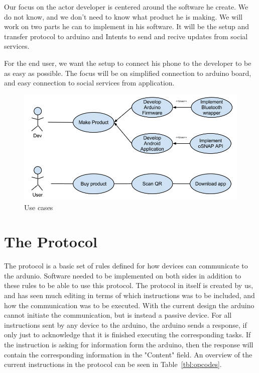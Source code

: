 Our focus on the actor developer is centered around the software he create. We do not know, and we don't need to know what product he is making. We will work on two parts he can to implement in his software. It will be the setup and transfer protocol to arduino and Intents to send and recive updates from social services.

For the end user, we want the setup to connect his phone to the developer to be as easy as possible. The focus will be on simplified connection to arduino board, and easy connection to social services from application.
\begin{figure}[hb!]
\centering \includegraphics[scale=0.50]{img/use-cases.png}
\caption{Use cases}
\label{fig:architecture-usecases}
\end{figure}

\section{The Protocol}

The protocol is a basic set of rules defined for how devices can communicate to the ardunio. Software needed to be implemented on both sides in addition to these rules to be able to use this protocol. The protocol in itself is created by us, and has seen much editing in terms of which instructions was to be included, and how the communication was to be executed. With the current design the arduino cannot initiate the communication, but is instead a passive device. For all instructions sent by any device to the arduino, the arduino sends a response, if only just to acknowledge that it is finished executing the corresponding tasks. If the instruction is asking for information form the arduino, then the response will contain the corresponding information in the "Content" field. An overview of the current instructions in the protocol can be seen in Table~\ref{tbl:opcodes}.

